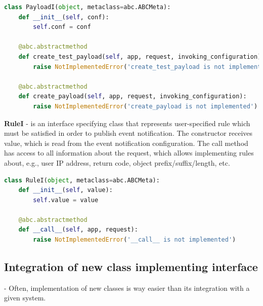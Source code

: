\documentclass{ExcelAtFIT}
\begin{document}
\begin{lstlisting}[language=Python, style=pythonStyle, caption=Interface of class used to create notification payload, label=lst:enoss-payloadi]
class PayloadI(object, metaclass=abc.ABCMeta):
    def __init__(self, conf):
        self.conf = conf

    @abc.abstractmethod
    def create_test_payload(self, app, request, invoking_configuration):
        raise NotImplementedError('create_test_payload is not implemented')

    @abc.abstractmethod
    def create_payload(self, app, request, invoking_configuration):
        raise NotImplementedError('create_payload is not implemented')
\end{lstlisting}

\textbf{RuleI} - is an interface specifying class that represents user-specified rule which must be satisfied in order to publish event notification. The constructor receives value, which is read from the event notification configuration. The call method has access to all information about the request, which allows implementing rules about, e.g., user IP address, return code, object prefix/suffix/length, etc.

\begin{lstlisting}[language=Python, style=pythonStyle, caption=Interface of class representing filter rule., label=lst:enoss-rulei]
class RuleI(object, metaclass=abc.ABCMeta):
    def __init__(self, value):
        self.value = value

    @abc.abstractmethod
    def __call__(self, app, request):
        raise NotImplementedError('__call__ is not implemented')
\end{lstlisting}

\subsection{Integration of new class implementing interface} - Often, implementation of new classes is way easier than its integration with a given system.
\end{document}
